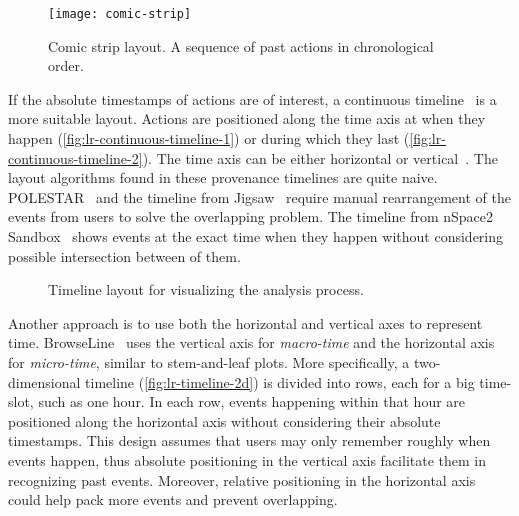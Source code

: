 \begin{figure}[!htb]
	\centering
	\texttt{[image: comic-strip]}
	\caption{Comic strip layout. A sequence of past actions in chronological order. }
	\label{fig:lr-comic-strip}
\end{figure}

If the absolute timestamps of actions are of interest, a continuous timeline~\cite{Derthick2001} is a more suitable layout. Actions are positioned along the time axis at when they happen (\autoref{fig:lr-continuous-timeline-1}) or during which they last (\autoref{fig:lr-continuous-timeline-2}). The time axis can be either horizontal or vertical~\cite{SandboxTimeline2012}. The layout algorithms found in these provenance timelines are quite naive. POLESTAR~\cite{Pioch2006} and the timeline from Jigsaw~\cite{Liu2010} require manual rearrangement of the events from users to solve the overlapping problem. The timeline from nSpace2 Sandbox~\cite{SandboxTimeline2012} shows events at the exact time when they happen without considering possible intersection between of them.

\begin{figure}[!htb]
\centering
{}

\vspace{.5\baselineskip}

\caption{Timeline layout for visualizing the analysis process.}
\end{figure}

Another approach is to use both the horizontal and vertical axes to represent time. BrowseLine~\cite{Hoeber2009} uses the vertical axis for \emph{macro-time} and the horizontal axis for \emph{micro-time}, similar to stem-and-leaf plots. More specifically, a two-dimensional timeline (\autoref{fig:lr-timeline-2d}) is divided into rows, each for a big time-slot, such as one hour. In each row, events happening within that hour are positioned along the horizontal axis without considering their absolute timestamps. This design assumes that users may only remember roughly when events happen, thus absolute positioning in the vertical axis facilitate them in recognizing past events. Moreover, relative positioning in the horizontal axis could help pack more events and prevent overlapping.


